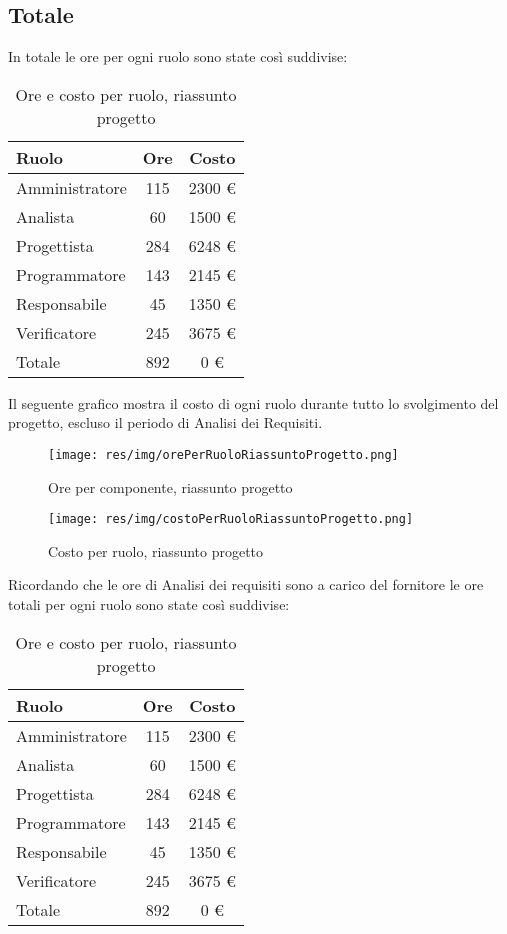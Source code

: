 \subsection{Totale}
In totale le ore per ogni ruolo sono state così suddivise:

\begin{table}[H]
	\centering
	\begin{tabular}{ l c c }
		\textbf{Ruolo} & \textbf{Ore} & \textbf{Costo} \\
		\hline
		Amministratore & 115 & 2300 \euro \\
		Analista & 60 & 1500 \euro \\
		Progettista & 284 & 6248 \euro \\
		Programmatore & 143 & 2145 \euro \\
		Responsabile & 45 & 1350 \euro \\
		Verificatore & 245 & 3675 \euro \\
		\hline
		Totale & 892 & 0 \euro \\
		\hline
	\end{tabular}
	\caption{Ore e costo per ruolo, riassunto progetto}
\end{table}

Il seguente grafico mostra il costo di ogni ruolo durante tutto lo svolgimento del progetto, escluso il periodo di Analisi dei Requisiti.

\begin{figure}[H]
  \begin{center}
    \texttt{[image: res/img/orePerRuoloRiassuntoProgetto.png]}
  \caption{Ore per componente, riassunto progetto}
  \end{center} 
\end{figure}  

\begin{figure}[H]
  \begin{center}
    \texttt{[image: res/img/costoPerRuoloRiassuntoProgetto.png]}
  \caption{Costo per ruolo, riassunto progetto}
  \end{center} 
\end{figure}  


Ricordando che le ore di Analisi dei requisiti sono a carico del fornitore le ore totali per ogni ruolo sono state così suddivise:
\begin{table}[H]
	\centering
	\begin{tabular}{ l c c }
		\textbf{Ruolo} & \textbf{Ore} & \textbf{Costo} \\
		\hline
		Amministratore & 115 & 2300 \euro \\
		Analista & 60 & 1500 \euro \\
		Progettista & 284 & 6248 \euro \\
		Programmatore & 143 & 2145 \euro \\
		Responsabile & 45 & 1350 \euro \\
		Verificatore & 245 & 3675 \euro \\
		\hline
		Totale & 892 & 0 \euro \\
		\hline
	\end{tabular}
	\caption{Ore e costo per ruolo, riassunto progetto}
\end{table}

